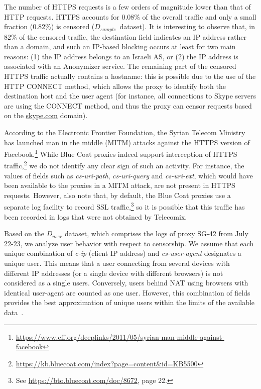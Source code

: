 \documentclass{sig-alternate-2013}
\newcommand{\descr}[1]{\smallskip\noindent{\bf #1}}
\def\du{$D_{user}$\xspace}
\def\ds{$D_{sample}$\xspace}
\begin{document}
 
\descr{HTTPS traffic.} 
The number of HTTPS requests is a few orders of magnitude lower than that of HTTP requests. HTTPS accounts for 0.08\% of the overall traffic and only a small fraction (0.82\%) is censored (\ds~dataset). 
It is interesting to observe that, in 82\% of the censored traffic, the destination field indicates an IP address rather than a domain, and such an IP-based blocking occurs at least for two main reasons: (1) the IP address belongs to an Israeli AS, or (2) the IP address is associated with an Anonymizer service. 
The remaining part of the censored HTTPS traffic actually contains a hostname: 
this is possible due to the use of the HTTP CONNECT method, which allows the proxy to identify both the destination host and the user agent (for instance, all connections to Skype servers are using the CONNECT method, and thus the proxy can censor requests based on the \url{skype.com} domain). 

According to the Electronic Frontier Foundation, the Syrian Telecom Ministry has launched man in the middle (MITM) attacks against the HTTPS version of Facebook.\footnote{\url{https://www.eff.org/deeplinks/2011/05/syrian-man-middle-against-facebook}} While Blue Coat proxies indeed support interception of HTTPS traffic,\footnote{\url{https://kb.bluecoat.com/index?page=content&id=KB5500}} we do not identify any clear sign of such an activity. For instance, the values of fields such as \emph{cs-uri-path}, \emph{cs-uri-query} and \emph{cs-uri-ext}, which would have been available to the proxies in a MITM attack, are not present in HTTPS requests. However, also note that, by default, the Blue Coat proxies use a separate log facility to record SSL traffic,\footnote{See \url{https://bto.bluecoat.com/doc/8672}, page 22.} so it is possible that this traffic has been recorded in logs that were not obtained by Telecomix.




\descr{User-based analysis.} Based on the \du dataset, which comprises  the logs of proxy SG-42 from July 22-23, we analyze user behavior with respect to censorship. We assume that each unique combination of {\em c-ip} (client IP address) and {\em cs-user-agent} designates a unique user. 
This means that a user connecting from several devices with different IP addresses (or a single device with different browsers) is not considered as a single users. Conversely, users behind NAT using browsers with identical user-agent are counted as one user. However, this combination of fields provides the best approximation of unique users within the limits of the available data~\cite{yen:tracking}.  
 
\end{document}
